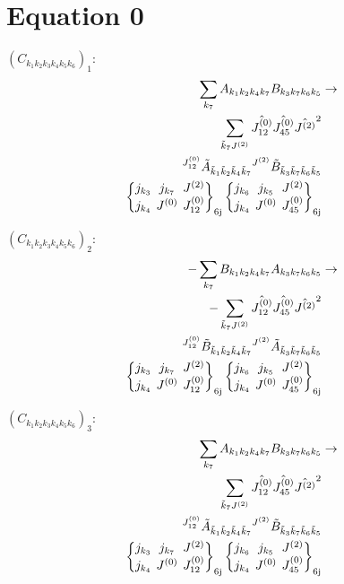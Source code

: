 \documentclass[11pt]{article}
\newcommand{\sixj}[6]{\begingroup\setlength{\arraycolsep}{0.2em}\begin{Bmatrix} #1 & #2 & #3 \\ #4 & #5 & #6 \end{Bmatrix}_{\text{6j}}\endgroup}
\begin{document}
\section{Equation 0}
$\left({C}_{{k}_{1}{k}_{2}{k}_{3}{k}_{4}{k}_{5}{k}_{6}}\right)_{1}$:
\begin{align}
\sum_{{k}_{7}}{A}_{{k}_{1}{k}_{2}{k}_{4}{k}_{7}}{B}_{{k}_{3}{k}_{7}{k}_{6}{k}_{5}}&\rightarrow \notag \\\sum_{\tilde{k}_{7}J^{(2)}}\hat{J^{(0)}_{12}}\hat{J^{(0)}_{45}}\hat{J^{(2)}}^{2}& \notag \\{}^{J^{(0)}_{12}}\tilde{A}_{\tilde{k}_{1}\tilde{k}_{2}\tilde{k}_{4}\tilde{k}_{7}}{}^{J^{(2)}}\tilde{B}_{\tilde{k}_{3}\tilde{k}_{7}\tilde{k}_{6}\tilde{k}_{5}}& \notag \\\sixj{j_{{k}_{3}}}{j_{{k}_{7}}}{J^{(2)}}{j_{{k}_{4}}}{J^{(0)}}{J^{(0)}_{12}}\sixj{j_{{k}_{6}}}{j_{{k}_{5}}}{J^{(2)}}{j_{{k}_{4}}}{J^{(0)}}{J^{(0)}_{45}}
\end{align}

$\left({C}_{{k}_{1}{k}_{2}{k}_{3}{k}_{4}{k}_{5}{k}_{6}}\right)_{2}$:
\begin{align}
-\sum_{{k}_{7}}{B}_{{k}_{1}{k}_{2}{k}_{4}{k}_{7}}{A}_{{k}_{3}{k}_{7}{k}_{6}{k}_{5}}&\rightarrow \notag \\-\sum_{\tilde{k}_{7}J^{(2)}}\hat{J^{(0)}_{12}}\hat{J^{(0)}_{45}}\hat{J^{(2)}}^{2}& \notag \\{}^{J^{(0)}_{12}}\tilde{B}_{\tilde{k}_{1}\tilde{k}_{2}\tilde{k}_{4}\tilde{k}_{7}}{}^{J^{(2)}}\tilde{A}_{\tilde{k}_{3}\tilde{k}_{7}\tilde{k}_{6}\tilde{k}_{5}}& \notag \\\sixj{j_{{k}_{3}}}{j_{{k}_{7}}}{J^{(2)}}{j_{{k}_{4}}}{J^{(0)}}{J^{(0)}_{12}}\sixj{j_{{k}_{6}}}{j_{{k}_{5}}}{J^{(2)}}{j_{{k}_{4}}}{J^{(0)}}{J^{(0)}_{45}}
\end{align}

$\left({C}_{{k}_{1}{k}_{2}{k}_{3}{k}_{4}{k}_{5}{k}_{6}}\right)_{3}$:
\begin{align}
\sum_{{k}_{7}}{A}_{{k}_{1}{k}_{2}{k}_{4}{k}_{7}}{B}_{{k}_{3}{k}_{7}{k}_{6}{k}_{5}}&\rightarrow \notag \\\sum_{\tilde{k}_{7}J^{(2)}}\hat{J^{(0)}_{12}}\hat{J^{(0)}_{45}}\hat{J^{(2)}}^{2}& \notag \\{}^{J^{(0)}_{12}}\tilde{A}_{\tilde{k}_{1}\tilde{k}_{2}\tilde{k}_{4}\tilde{k}_{7}}{}^{J^{(2)}}\tilde{B}_{\tilde{k}_{3}\tilde{k}_{7}\tilde{k}_{6}\tilde{k}_{5}}& \notag \\\sixj{j_{{k}_{3}}}{j_{{k}_{7}}}{J^{(2)}}{j_{{k}_{4}}}{J^{(0)}}{J^{(0)}_{12}}\sixj{j_{{k}_{6}}}{j_{{k}_{5}}}{J^{(2)}}{j_{{k}_{4}}}{J^{(0)}}{J^{(0)}_{45}}
\end{align}
\end{document}
